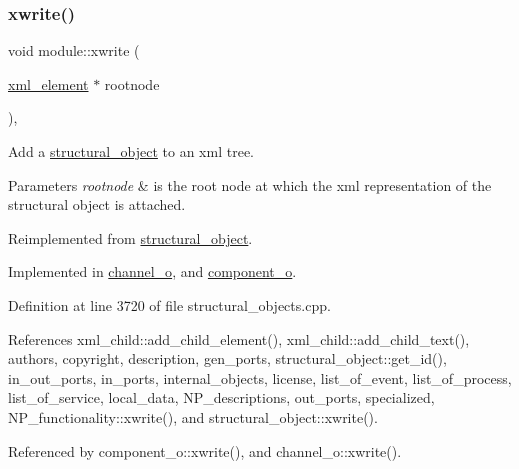 \subsubsection{\texorpdfstring{xwrite()}{xwrite()}}
{\footnotesize\ttfamily void module\+::xwrite (\begin{DoxyParamCaption}\item[{\hyperlink{classxml__element}{xml\+\_\+element} $\ast$}]{rootnode }\end{DoxyParamCaption})\hspace{0.3cm}{\ttfamily [override]}, {}}



Add a \hyperlink{classstructural__object}{structural\+\_\+object} to an xml tree. 


\begin{DoxyParams}{Parameters}
{\em rootnode} & is the root node at which the xml representation of the structural object is attached. \\
\hline
\end{DoxyParams}


Reimplemented from \hyperlink{classstructural__object_a7b0b509094451578b2dc10a9b716b16e}{structural\+\_\+object}.



Implemented in \hyperlink{classchannel__o_aa9272c96bee02d7ef08ef3d589725a6d}{channel\+\_\+o}, and \hyperlink{classcomponent__o_a96fc64957b68763fbfc946efdbc0249e}{component\+\_\+o}.



Definition at line 3720 of file structural\+\_\+objects.\+cpp.



References xml\+\_\+child\+::add\+\_\+child\+\_\+element(), xml\+\_\+child\+::add\+\_\+child\+\_\+text(), authors, copyright, description, gen\+\_\+ports, structural\+\_\+object\+::get\+\_\+id(), in\+\_\+out\+\_\+ports, in\+\_\+ports, internal\+\_\+objects, license, list\+\_\+of\+\_\+event, list\+\_\+of\+\_\+process, list\+\_\+of\+\_\+service, local\+\_\+data, N\+P\+\_\+descriptions, out\+\_\+ports, specialized, N\+P\+\_\+functionality\+::xwrite(), and structural\+\_\+object\+::xwrite().



Referenced by component\+\_\+o\+::xwrite(), and channel\+\_\+o\+::xwrite().

